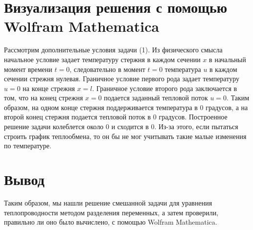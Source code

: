 \documentclass[a4paper, 12pt]{report}
\begin{document}
	\section*{Визуализация решения с помощью Wolfram Mathematica}
	Рассмотрим дополнительные условия задачи (1). Из физического смысла начальное условие задает температуру стержня в каждом сечении $x$ в начальный момент времени $t = 0$, следовательно в момент
	$t = 0$ температура $u$ в каждом сечении стрежня нулевая. Граничное условие первого рода задает температуру $u=0$ на конце стрежня $x=l$. Граничное условие второго рода заключается в том, что на конец стрежня $x=0$ подается заданный тепловой поток $u=0$. Таким образом, на одном конце
	стержня поддерживается температура в 0 градусов, а на второй конец стержня подается
	тепловой поток в 0 градусов.
	Построенное решение задачи колеблется около 0 и сходится в 0. Из-за этого, если пытаться строить график теплообмена, то он бы не мог учитывать такие малые изменения по температуре.
\section*{Вывод}
Таким образом, мы нашли решение смешанной задачи для уравнения теплопроводности методом разделения переменных, а затем проверили, правильно ли оно было вычислено, с помощью Wolfram Mathematica.
\end{document}
